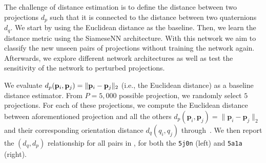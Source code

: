 
The challenge of distance estimation is to define the distance between two projections $d_p$ such that it is connected to the distance between two quaternions $d_q$. We start by using the Euclidean distance as the baseline. Then, we learn the distance metric using the SiameseNN architecture. With this network we aim to classify the new unseen pairs of projections without training the network again. Afterwards, we explore different network architectures as well as test the sensitivity of the network to perturbed projections.



We evaluate $d_p(\mathbf{p}_i, \mathbf{p}_j) = \Vert \mathbf{p}_i - \mathbf{p}_j \Vert_2$ (i.e., the Euclidean distance) as a baseline distance estimator.
From $P = 5,000$ possible projection, we randomly select $5$ projections.
For each of these projections, we compute the Euclidean distance between aforementioned projection and all the others $d_p(\mathbf{p}_i,\mathbf{p}_j)=\lVert\mathbf{p}_i-\mathbf{p}_j\rVert_2$ and their corresponding orientation distance $d_q(q_i,q_j)$ through~.
We then report the $(d_q,d_p)$ relationship for all pairs in , for both the \texttt{5j0n} (left) and \texttt{5a1a} (right).

